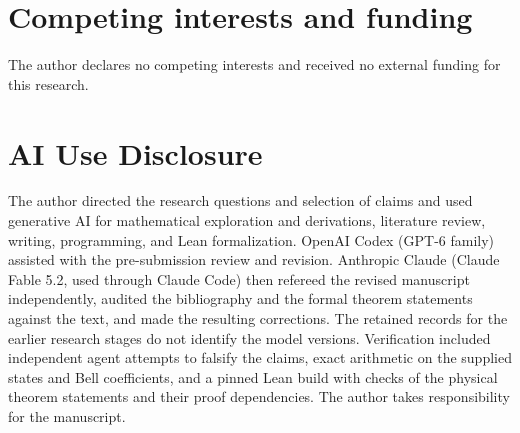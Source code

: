 \documentclass[11pt]{article}
\theoremstyle{definition}
\begin{document}
\section*{Competing interests and funding}

The author declares no competing interests and received no external
funding for this research.

\section*{AI Use Disclosure}

The author directed the research questions and selection of claims and
used generative AI for mathematical exploration and derivations, literature
review, writing, programming, and Lean formalization. OpenAI Codex
(GPT-6 family) assisted with the pre-submission review and revision.
Anthropic Claude (Claude Fable 5.2, used through Claude Code) then
refereed the revised manuscript independently, audited the bibliography
and the formal theorem statements against the text, and made the
resulting corrections.
The retained records for the earlier research stages do not identify
the model versions. Verification included independent agent attempts to
falsify the claims, exact arithmetic on the supplied states and Bell
coefficients, and a pinned Lean build with checks of the physical theorem
statements and their proof dependencies. The author takes responsibility
for the manuscript.

\appendix


\begingroup
\small
\setlength{\bibsep}{2pt}


\endgroup
\end{document}
